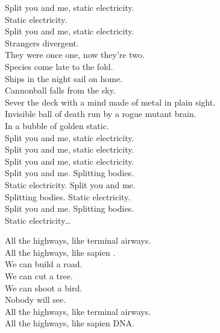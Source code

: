 Split you and me, static electricity. \\
Static electricity. \\
Split you and me, static electricity. \\

Strangers divergent. \\
They were once one, now they're two. \\
Species come late to the fold. \\
Ships in the night sail on home. \\
Cannonball falls from the sky. \\
Sever the deck with a mind made of metal in plain sight. \\
Invisible ball of death run by a rogue mutant brain. \\
In a bubble of golden static. \\

Split you and me, static electricity. \\
Split you and me, static electricity. \\
Split you and me, static electricity. \\

Split you and me. Splitting bodies. \\
Static electricity. Split you and me. \\
Splitting bodies. Static electricity. \\
Split you and me. Splitting bodies. \\
Static electricity… \\




All the highways, like terminal airways. \\
All the highways, like sapien . \\

We can build a road. \\
We can cut a tree. \\
We can shoot a bird. \\
Nobody will see. \\

All the highways, like terminal airways. \\
All the highways, like sapien DNA. \\


